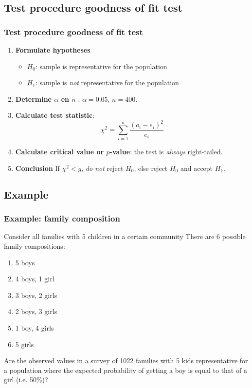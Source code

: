 \documentclass{beamer}
\begin{document}
\subsection{Test procedure goodness of fit test}

\begin{frame}
  \frametitle{Test procedure goodness of fit test}
  \begin{enumerate}
  \item \textbf{Formulate hypotheses}
    \begin{itemize}
      \item $H_{0}$: sample is representative for the population
      \item $H_{1}$: sample is \emph{not} representative for the population
    \end{itemize}
  \item \textbf{Determine $\alpha$ en $n$} : $\alpha = 0.05$, $n = 400$.
  \item \textbf{Calculate test statistic}:
  \[ \chi^{2} = \sum_{i=1}^{n} \frac{(o_{i} - e_{i})^{2}}{e_{i}} \]
  \item \textbf{Calculate critical value or $p$-value}: the test is \emph{always} right-tailed.
  \item \textbf{Conclusion} If $\chi^2 < g$, \emph{do not} reject $H_{0}$, else reject $H_{0}$ and accept $H_{1}$.
\end{enumerate}
\end{frame}

\subsection{Example}

\begin{frame}
  \frametitle{Example: family composition}
  
  Consider all families with 5 children in a certain community
  \pause
  There are 6 possible family compositions:
  \begin{enumerate}
    \item 5 boys
    \item 4 boys, 1 girl
    \item 3 boys, 2 girls
    \item 2 boys, 3 girls
    \item 1 boy, 4 girls
    \item 5 girls
  \end{enumerate}

  Are the observed values in a survey of 1022 families with 5 kids representative for a population where the expected probability of getting a boy is equal to that of a girl (i.e. 50\%)?
\end{frame}
\end{document}
